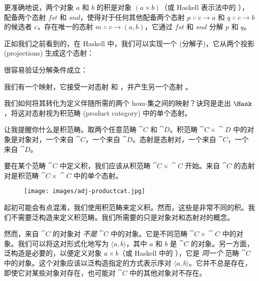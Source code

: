 更准确地说，两个对象 $a$ 和 $b$ 的积是对象 $(a\times{}b)$（或 Haskell 表示法中的 ），配备两个态射 $\mathit{fst}$ 和 $\mathit{snd}$，使得对于任何其他配备两个态射 $p \Colon c \to a$ 和 $q \Colon c \to b$ 的候选者 $c$，存在唯一的态射 $m \Colon c \to (a, b)$，它通过 $\mathit{fst}$ 和 $\mathit{snd}$ 分解 $p$ 和 $q$。

正如我们之前看到的，在 Haskell 中，我们可以实现一个  (分解子)，它从两个投影 (projections) 生成这个态射：

很容易验证分解条件成立：

我们有一个映射，它接受一对态射  和 ，并产生另一个态射 。

我们如何将其转化为定义伴随所需的两个 hom-集之间的映射？诀窍是走出 $\Hask$，将这对态射视为积范畴 (product category) 中的单个态射。

让我提醒你什么是积范畴。取两个任意范畴 $\cat{C}$ 和 $\cat{D}$。积范畴 $\cat{C}\times{}\cat{D}$ 中的对象是对象对，一个来自 $\cat{C}$，一个来自 $\cat{D}$。态射是态射对，一个来自 $\cat{C}$，一个来自 $\cat{D}$。

要在某个范畴 $\cat{C}$ 中定义积，我们应该从积范畴 $\cat{C}\times{}\cat{C}$ 开始。来自 $\cat{C}$ 的态射对是积范畴 $\cat{C}\times{}\cat{C}$ 中的单个态射。

\begin{figure}[H]
  \centering
  \texttt{[image: images/adj-productcat.jpg]}
\end{figure}

\noindent
起初可能会有点混淆，我们使用积范畴来定义积。然而，这些是非常不同的积。我们不需要泛构造来定义积范畴。我们所需要的只是对象对和态射对的概念。

然而，来自 $\cat{C}$ 的对象对 \emph{不是} $\cat{C}$ 中的对象。它是不同范畴 $\cat{C}\times{}\cat{C}$ 中的对象。我们可以将这对形式化地写为 $\langle a, b \rangle$，其中 $a$ 和 $b$ 是 $\cat{C}$ 的对象。另一方面，泛构造是必要的，以便定义对象 $a\times{}b$（或 Haskell 中的 ），它是 \emph{同一个} 范畴 $\cat{C}$ 中的对象。这个对象应该以泛构造指定的方式表示序对 $\langle a, b \rangle$。它并不总是存在，即使它对某些对象对存在，也可能对 $\cat{C}$ 中的其他对象对不存在。

